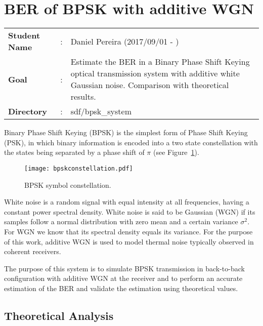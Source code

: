 \clearpage
\section{BER of BPSK with additive WGN}

\begin{tcolorbox}	
\begin{tabular}{p{2.75cm} p{0.2cm} p{10.5cm}} 	
\textbf{Student Name}  &:& Daniel Pereira (2017/09/01 - )\\
\textbf{Goal}          &:& Estimate the BER in a Binary Phase Shift Keying optical transmission system with additive white Gaussian noise. Comparison with theoretical results.\\
\textbf{Directory}              &:& sdf/bpsk\_system  
\end{tabular}
\end{tcolorbox}

Binary Phase Shift Keying (BPSK) is the simplest form of Phase Shift Keying (PSK), in which binary information is encoded into a two state constellation with the states being separated by a phase shift of $\pi$ (see Figure~\ref{fig:BPSKConst}).

\begin{figure}[h]
\centering
\texttt{[image: bpskconstellation.pdf]}
\caption{BPSK symbol constellation.}
\label{fig:BPSKConst}
\end{figure}

\par
White noise is a random signal with equal intensity at all frequencies, having a constant power spectral density. White noise is said to be Gaussian (WGN) if its samples follow a normal distribution with zero mean and a certain variance $\sigma^2$. For WGN we know that its spectral density equals its variance. For the purpose of this work, additive WGN is used to model thermal noise typically observed in coherent receivers.
\par
The purpose of this system is to simulate BPSK transmission in back-to-back configuration with additive WGN at the receiver and to perform an accurate estimation of the BER and validate the estimation using theoretical values.

\subsection{Theoretical Analysis}

